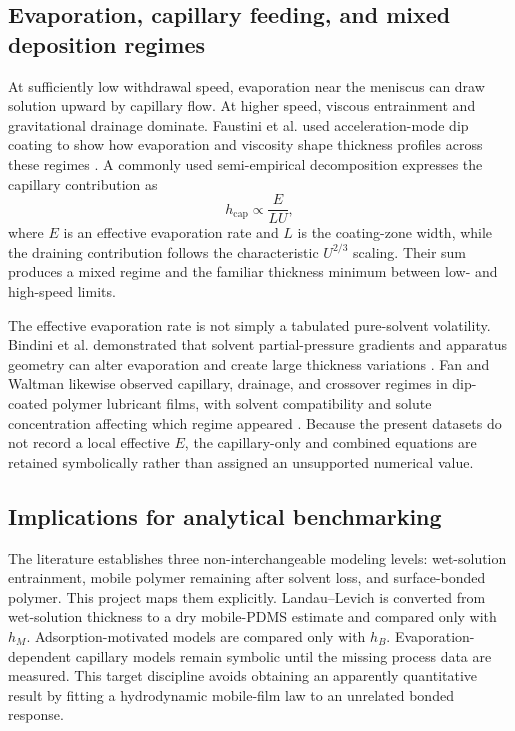 \documentclass[11pt]{article}
\begin{document}
\subsection{Evaporation, capillary feeding, and mixed deposition regimes}
At sufficiently low withdrawal speed, evaporation near the meniscus can draw solution upward by capillary flow. At higher speed, viscous entrainment and gravitational drainage dominate. Faustini et al. used acceleration-mode dip coating to show how evaporation and viscosity shape thickness profiles across these regimes \cite{faustini2014}. A commonly used semi-empirical decomposition expresses the capillary contribution as
\begin{equation}
h_{\mathrm{cap}} \propto \frac{E}{L U},
\end{equation}
where $E$ is an effective evaporation rate and $L$ is the coating-zone width, while the draining contribution follows the characteristic $U^{2/3}$ scaling. Their sum produces a mixed regime and the familiar thickness minimum between low- and high-speed limits.

The effective evaporation rate is not simply a tabulated pure-solvent volatility. Bindini et al. demonstrated that solvent partial-pressure gradients and apparatus geometry can alter evaporation and create large thickness variations \cite{bindini2017}. Fan and Waltman likewise observed capillary, drainage, and crossover regimes in dip-coated polymer lubricant films, with solvent compatibility and solute concentration affecting which regime appeared \cite{fan2018}. Because the present datasets do not record a local effective $E$, the capillary-only and combined equations are retained symbolically rather than assigned an unsupported numerical value.

\subsection{Implications for analytical benchmarking}
The literature establishes three non-interchangeable modeling levels: wet-solution entrainment, mobile polymer remaining after solvent loss, and surface-bonded polymer. This project maps them explicitly. Landau--Levich is converted from wet-solution thickness to a dry mobile-PDMS estimate and compared only with $h_M$. Adsorption-motivated models are compared only with $h_B$. Evaporation-dependent capillary models remain symbolic until the missing process data are measured. This target discipline avoids obtaining an apparently quantitative result by fitting a hydrodynamic mobile-film law to an unrelated bonded response.
\end{document}
